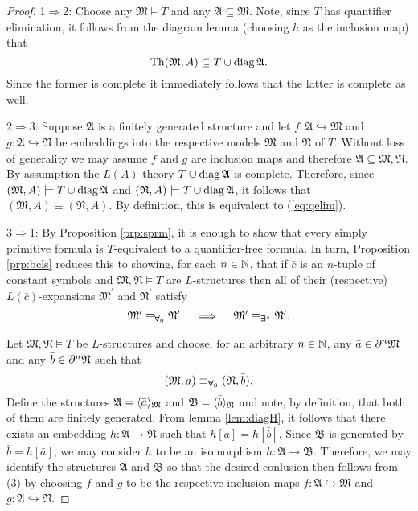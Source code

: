 \begin{proof}
	1$\Rightarrow$2:  Choose any $\mathfrak{M}\models T$ and any $\mathfrak{A}\subseteq\mathfrak{M}$.  Note, since $T$ has quantifier elimination, it follows from the diagram lemma (choosing $h$ as the inclusion map) that
	\begin{equation}
		\operatorname{Th}(\mathfrak{M},A)\subseteq T\cup\operatorname{diag}\mathfrak{A}.
	\end{equation}
	Since the former is complete it immediately follows that the latter is complete as well.

	2$\Rightarrow$3:  Suppose $\mathfrak{A}$ is a finitely generated structure and let $f\colon\mathfrak{A}\hookrightarrow\mathfrak{M}$ and $g\colon\mathfrak{A}\hookrightarrow\mathfrak{N}$ be embeddings into the respective models $\mathfrak{M}$ and $\mathfrak{N}$ of $T$.  Without loss of generality we may assume $f$ and $g$ are inclusion maps and therefore $\mathfrak{A}\subseteq\mathfrak{M},\mathfrak{N}$.  By assumption the $L(A)$-theory $T\cup\operatorname{diag}\mathfrak{A}$ is complete.  Therefore, since $(\mathfrak{M},A)\models T\cup\operatorname{diag}\mathfrak{A}$ and $(\mathfrak{N},A)\models T\cup\operatorname{diag}\mathfrak{A}$, it follows that $(\mathfrak{M},A)\equiv(\mathfrak{N},A)$.  By definition, this is equivalent to (\ref{eq:qelim}).

	3$\Rightarrow$1:  By Proposition \ref{prp:sprm}, it is enough to show that every simply primitive formula is $T$-equivalent to a quantifier-free formula.  In turn, Proposition \ref{prp:bcls} reduces this to showing, for each $n\in\mathbb{N}$, that if $\bar{c}$ is an $n$-tuple of constant symbols and $\mathfrak{M},\mathfrak{N}\models T$ are $L$-structures then all of their (respective) $L(\bar{c})$-expansions $\mathfrak{M}^\prime$ and $\mathfrak{N}^\prime$ satisfy
	\begin{equation}
		\mathfrak{M}^\prime\equiv_{\bm{\forall}_{0}}\mathfrak{N}^\prime \quad\implies\quad \mathfrak{M}^\prime\equiv_{\bm{\exists}_{}^\ast}\mathfrak{N}^\prime.
	\end{equation}

	Let $\mathfrak{M},\mathfrak{N}\models T$ be $L$-structures and choose, for an arbitrary $n\in\mathbb{N}$, any $\bar{a}\in\partial^{n}\mathfrak{M}$ and any $\bar{b}\in\partial^{n}\mathfrak{N}$ such that
	\begin{equation}
		(\mathfrak{M},\bar{a})\equiv_{\bm{\forall}_{0}}(\mathfrak{N},\bar{b}).
	\end{equation}
	Define the structures $\mathfrak{A}=\langle \bar{a}\rangle_{\mathfrak{M}}$ and $\mathfrak{B}=\langle \bar{b}\rangle_{\mathfrak{N}}$ and note, by definition, that both of them are finitely generated.  From lemma \ref{lem:diagH}, it follows that there exists an embedding $h\colon\mathfrak{A}\to\mathfrak{N}$ such that $h[\bar{a}]=h[\bar{b}]$.  Since $\mathfrak{B}$ is generated by $\bar{b}=h[\bar{a}]$, we may consider $h$ to be an isomorphism $h\colon\mathfrak{A}\to\mathfrak{B}$.  Therefore, we may identify the structures $\mathfrak{A}$ and $\mathfrak{B}$ so that the desired conlusion then follows from (3) by choosing $f$ and $g$ to be the respective inclusion maps $f\colon\mathfrak{A}\hookrightarrow\mathfrak{M}$ and $g\colon\mathfrak{A}\hookrightarrow\mathfrak{N}$.
\end{proof}


